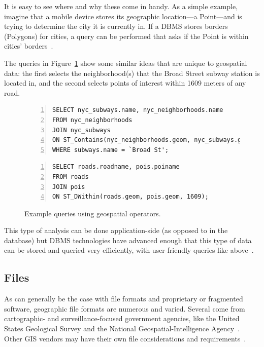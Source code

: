 It is easy to see where and why these come in handy. As a simple example, imagine that a mobile device stores its geographic location---a Point---and is trying to determine the city it is currently in. If a DBMS stores borders (Polygons) for cities, a query can be performed that asks if the Point is within cities' borders~\cite{Boundless}.

The queries in Figure~\ref{fig:spatialselect1} show some similar ideas that are unique to geospatial data: the first selects the neighborhood(s) that the Broad Street subway station is located in, and the second selects points of interest within 1609 meters of any road.

\begin{figure}
\begin{Verbatim}[samepage=true,baselinestretch=1,numbers=left,xleftmargin=12mm]
SELECT nyc_subways.name, nyc_neighborhoods.name
FROM nyc_neighborhoods
JOIN nyc_subways
ON ST_Contains(nyc_neighborhoods.geom, nyc_subways.geom)
WHERE subways.name = `Broad St';
\end{Verbatim}

\begin{Verbatim}[samepage=true,baselinestretch=1,numbers=left,xleftmargin=12mm]
SELECT roads.roadname, pois.poiname
FROM roads
JOIN pois 
ON ST_DWithin(roads.geom, pois.geom, 1609);
\end{Verbatim}
\vspace{-20pt}
\caption{Example queries using geospatial operators.}
\label{fig:spatialselect1}
\end{figure}

This type of analysis can be done application-side (as opposed to in the database) but DBMS technologies have advanced enough that this type of data can be stored and queried very efficiently, with user-friendly queries like above~\cite{Boundless}.

\subsection{Files}
\label{background_formats}
As can generally be the case with file formats and proprietary or fragmented software, geographic file formats are numerous and varied. Several come from cartographic- and surveillance-focused government agencies, like the United States Geological Survey and the National Geospatial-Intelligence Agency~\cite{UsgsStandards}. Other GIS vendors may have their own file considerations and requirements~\cite{slashgeo,Environ1998,GeoJSON}.

